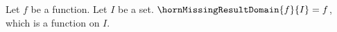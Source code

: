 

\begin{definition}\label{horn_missing_result_domain}
    Let $f$ be a function.
    Let $I$ be a set.
    $\hornMissingResultDomain{f}{I}=f$, which is a function on $I$.
\end{definition}
